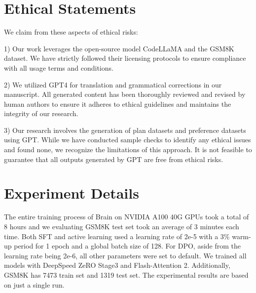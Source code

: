 \documentclass[11pt]{article}
\begin{document}
\section*{Ethical Statements}

We claim from these aspects of ethical risks: 

1) Our work leverages the open-source model CodeLLaMA and the GSM8K dataset. We have strictly followed their licensing protocols to ensure compliance with all usage terms and conditions.

2) We utilized GPT4 for translation and grammatical corrections in our manuscript. All generated content has been thoroughly reviewed and revised by human authors to ensure it adheres to ethical guidelines and maintains the integrity of our research.

3) Our research involves the generation of plan datasets and preference datasets using GPT. While we have conducted sample checks to identify any ethical issues and found none, we recognize the limitations of this approach. It is not feasible to guarantee that all outputs generated by GPT are free from ethical risks.





\appendix


\onecolumn
\section{Experiment Details}


The entire training process of Brain on NVIDIA A100 40G GPUs took a total of 8 hours and we evaluating GSM8K test set took an average of 3 minutes each time. Both SFT and active learning used a learning rate of 2e-5 with a 3\% warm-up period for 1 epoch and a global batch size of 128. For DPO, aside from the learning rate being 2e-6, all other parameters were set to default. We trained all models with DeepSpeed ZeRO Stage3 and Flash-Attention 2. Additionally, GSM8K has 7473 train set and 1319 test set. The experimental results are based on just a single run.
\end{document}
